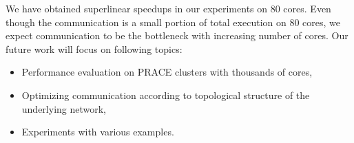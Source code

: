\documentclass{article}
\begin{document}
We have obtained superlinear speedups in our experiments on 80 cores.
Even though the communication is a small portion of total execution on 80 cores, we expect communication to be the bottleneck with increasing number of cores.
Our future work will focus on following topics:

\begin{itemize}
  \item Performance evaluation on PRACE clusters with thousands of cores,
  \item Optimizing communication according to topological structure of the underlying network,
  \item Experiments with various examples.
\end{itemize}



\nocite{*} %
\end{document}
